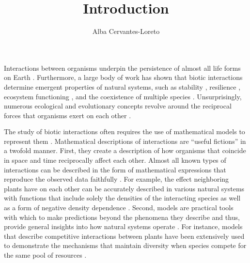 \documentclass[12pt]{article}
\title{Introduction}
\author[1]{Alba Cervantes-Loreto}
\date{}
\begin{document}
\linenumbers
\baselineskip30pt
\maketitle


Interactions between organisms underpin the persistence of almost all life forms on Earth \citep{lawton1999there}. Furthermore, a large body of work has shown that biotic interactions determine emergent properties of natural systems, such as stability \citep{may1972will, wootton2016many,song2018will}, resilience \citep{capdevila2021reconciling}, ecosystem functioning \citep{turnbull2013coexistence,godoy2020excess}, and the coexistence of multiple species \citep{chesson2000mechanisms,saavedra2017structural}. Unsurprisingly, numerous ecological and evolutionary concepts revolve around the reciprocal forces that organisms exert on each other \citep{gause_experimental_1934,macarthur1967limiting,thompson1999evolution, hillerislambers2012rethinking, chase2009ecological}.

The study of biotic interactions often requires the use of mathematical models to represent them \citep{maynard1978models}. Mathematical descriptions of interactions are ``useful fictions'' \citep{box2011statistical} in a twofold manner. First, they create a description of how organisms that coincide in space and time reciprocally affect each other. Almost all known types of interactions can be described in the form of mathematical expressions that reproduce the observed data faithfully \citep{volterra1926fluctuations,holling1959some,holt1977predation,adler2018competition,wood1999super,holland2002population,vazquez2005interaction,stouffer2021hidden} . For example, the effect neighboring plants have on each other can be accurately described in various natural systems with functions that include solely the densities of the interacting species as well as a form of negative density dependence \citep{adler2018competition,hart2018quantify}. Second, models are practical tools with which to make predictions beyond the phenomena they describe and thus, provide general insights into how natural systems operate \citep{evans2012predictive,stouffer2019all}. For instance, models that describe competitive interactions between plants have been extensively used to demonstrate the mechanisms that maintain diversity when species compete for the same pool of resources \citep{levine2009importance,godoy_phylogenetic_2014, godoy_phenology_2014, stouffer2018cyclic,bimler_accurate_2018}.
\end{document}

